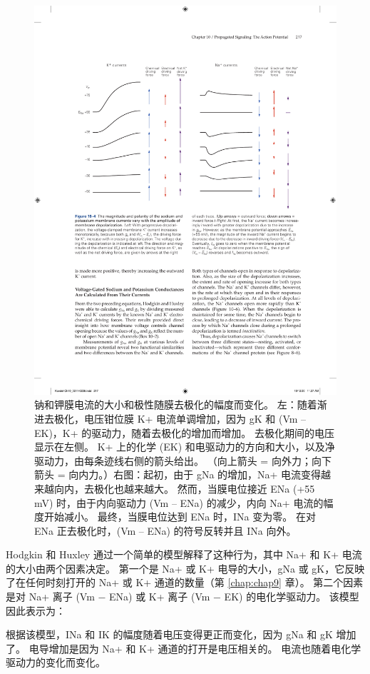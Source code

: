 \begin{figure}[htbp]
	\centering
	\includegraphics[width=0.8\linewidth]{chap10/fig_10_4}
	\caption{钠和钾膜电流的大小和极性随膜去极化的幅度而变化。 左：随着渐进去极化，电压钳位膜 K+ 电流单调增加，因为 gK 和 (Vm – EK)，K+ 的驱动力，随着去极化的增加而增加。 去极化期间的电压显示在左侧。 K+ 上的化学 (EK) 和电驱动力的方向和大小，以及净驱动力，由每条迹线右侧的箭头给出。 （向上箭头 = 向外力；向下箭头 = 向内力。）右图：起初，由于 gNa 的增加，Na+ 电流变得越来越向内，去极化也越来越大。 然而，当膜电位接近 ENa (+55 mV) 时，由于内向驱动力 (Vm – ENa) 的减少，内向 Na+ 电流的幅度开始减小。 最终，当膜电位达到 ENa 时，INa 变为零。 在对 ENa 正去极化时，(Vm – ENa) 的符号反转并且 INa 向外。}
	\label{fig:10_4}
\end{figure}


Hodgkin 和 Huxley 通过一个简单的模型解释了这种行为，其中 Na+ 和 K+ 电流的大小由两个因素决定。 
第一个是 Na+ 或 K+ 电导的大小，gNa 或 gK，它反映了在任何时刻打开的 Na+ 或 K+ 通道的数量（第 \ref{chap:chap9} 章）。 
第二个因素是对 Na+ 离子 (Vm − ENa) 或 K+ 离子 (Vm − EK) 的电化学驱动力。 
该模型因此表示为：


根据该模型，INa 和 IK 的幅度随着电压变得更正而变化，因为 gNa 和 gK 增加了。 
电导增加是因为 Na+ 和 K+ 通道的打开是电压相关的。 
电流也随着电化学驱动力的变化而变化。


